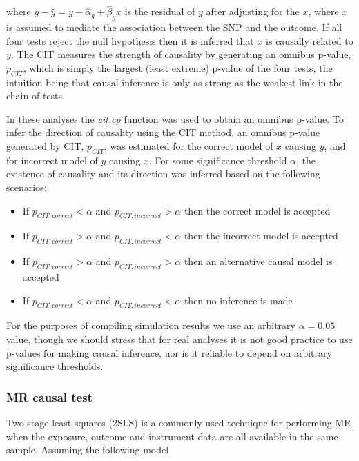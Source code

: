 \documentclass[]{article}
\providecommand{\tightlist}{%
  \setlength{\itemsep}{0pt}\setlength{\parskip}{0pt}}
\begin{document}
where \(y - \hat{y} = y - \hat{\alpha}_g + \hat{\beta}_g x\) is the
residual of \(y\) after adjusting for the \(x\), where \(x\) is assumed
to mediate the association between the SNP and the outcome. If all four
tests reject the null hypothesis then it is inferred that \(x\) is
causally related to \(y\). The CIT measures the strength of causality by
generating an omnibus p-value, \(p_{CIT}\), which is simply the largest
(least extreme) p-value of the four tests, the intuition being that
causal inference is only as strong as the weakest link in the chain of
tests.

In these analyses the \emph{cit.cp} function was used to obtain an
omnibus p-value. To infer the direction of causality using the CIT
method, an omnibus p-value generated by CIT, \(p_{CIT}\), was estimated
for the correct model of \(x\) causing \(y\), and for incorrect model of
\(y\) causing \(x\). For some significance threshold \(\alpha\), the
existence of causality and its direction was inferred based on the
following scenarios:

\begin{itemize}
\tightlist
\item
  If \(p_{CIT,correct} < \alpha\) and \(p_{CIT,incorrect} > \alpha\)
  then the correct model is accepted
\item
  If \(p_{CIT,correct} > \alpha\) and \(p_{CIT,incorrect} < \alpha\)
  then the incorrect model is accepted
\item
  If \(p_{CIT,correct} > \alpha\) and \(p_{CIT,incorrect} > \alpha\)
  then an alternative causal model is accepted
\item
  If \(p_{CIT,correct} < \alpha\) and \(p_{CIT,incorrect} < \alpha\)
  then no inference is made
\end{itemize}

For the purposes of compiling simulation results we use an arbitrary
\(\alpha = 0.05\) value, though we should stress that for real analyses
it is not good practice to use p-values for making causal inference, nor
is it reliable to depend on arbitrary significance thresholds.

\subsubsection{MR causal test}\label{mr-causal-test}

Two stage least squares (2SLS) is a commonly used technique for
performing MR when the exposure, outcome and instrument data are all
available in the same sample. Assuming the following model
\end{document}
